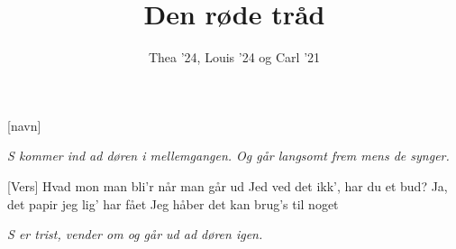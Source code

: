 \documentclass[a4paper,11pt]{article}
\title{Den røde tråd}
\author{Thea '24, Louis '24 og Carl '21}
\begin{document}
\maketitle

\begin{roles}
[navn]
\end{roles}

\textit{S kommer ind ad døren i mellemgangen. Og går langsomt frem mens de synger.}

\begin{song}
[Vers] Hvad mon man bli'r når man går ud
Jed ved det ikk', har du et bud?
Ja, det papir jeg lig' har fået
Jeg håber det kan brug's til noget
\end{song}

\textit{S er trist, vender om og går ud ad døren igen.}
\end{document}
